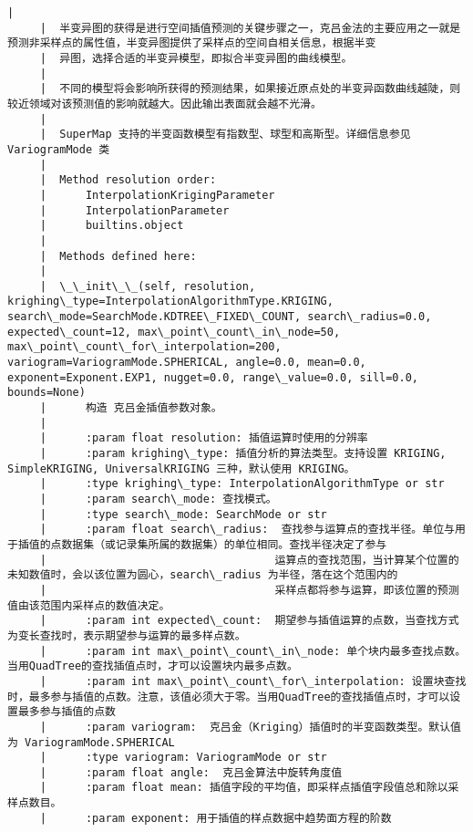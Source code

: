 \documentclass[11pt]{article}
\begin{document}
\begin{Verbatim}[commandchars=\\\{\}]
     |  
     |  半变异图的获得是进行空间插值预测的关键步骤之一，克吕金法的主要应用之一就是预测非采样点的属性值，半变异图提供了采样点的空间自相关信息，根据半变
     |  异图，选择合适的半变异模型，即拟合半变异图的曲线模型。
     |  
     |  不同的模型将会影响所获得的预测结果，如果接近原点处的半变异函数曲线越陡，则较近领域对该预测值的影响就越大。因此输出表面就会越不光滑。
     |  
     |  SuperMap 支持的半变函数模型有指数型、球型和高斯型。详细信息参见 VariogramMode 类
     |  
     |  Method resolution order:
     |      InterpolationKrigingParameter
     |      InterpolationParameter
     |      builtins.object
     |  
     |  Methods defined here:
     |  
     |  \_\_init\_\_(self, resolution, krighing\_type=InterpolationAlgorithmType.KRIGING, search\_mode=SearchMode.KDTREE\_FIXED\_COUNT, search\_radius=0.0, expected\_count=12, max\_point\_count\_in\_node=50, max\_point\_count\_for\_interpolation=200, variogram=VariogramMode.SPHERICAL, angle=0.0, mean=0.0, exponent=Exponent.EXP1, nugget=0.0, range\_value=0.0, sill=0.0, bounds=None)
     |      构造 克吕金插值参数对象。
     |      
     |      :param float resolution: 插值运算时使用的分辨率
     |      :param krighing\_type: 插值分析的算法类型。支持设置 KRIGING, SimpleKRIGING, UniversalKRIGING 三种，默认使用 KRIGING。
     |      :type krighing\_type: InterpolationAlgorithmType or str
     |      :param search\_mode: 查找模式。
     |      :type search\_mode: SearchMode or str
     |      :param float search\_radius:  查找参与运算点的查找半径。单位与用于插值的点数据集（或记录集所属的数据集）的单位相同。查找半径决定了参与
     |                                   运算点的查找范围，当计算某个位置的未知数值时，会以该位置为圆心，search\_radius 为半径，落在这个范围内的
     |                                   采样点都将参与运算，即该位置的预测值由该范围内采样点的数值决定。
     |      :param int expected\_count:  期望参与插值运算的点数，当查找方式为变长查找时，表示期望参与运算的最多样点数。
     |      :param int max\_point\_count\_in\_node: 单个块内最多查找点数。当用QuadTree的查找插值点时，才可以设置块内最多点数。
     |      :param int max\_point\_count\_for\_interpolation: 设置块查找时，最多参与插值的点数。注意，该值必须大于零。当用QuadTree的查找插值点时，才可以设置最多参与插值的点数
     |      :param variogram:  克吕金（Kriging）插值时的半变函数类型。默认值为 VariogramMode.SPHERICAL
     |      :type variogram: VariogramMode or str
     |      :param float angle:  克吕金算法中旋转角度值
     |      :param float mean: 插值字段的平均值，即采样点插值字段值总和除以采样点数目。
     |      :param exponent: 用于插值的样点数据中趋势面方程的阶数

\end{Verbatim}
\end{document}
